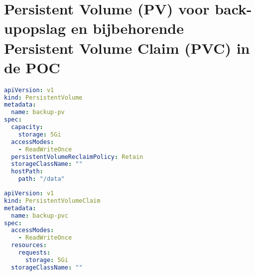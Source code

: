 \chapter{Persistent Volume (PV) voor back-upopslag en bijbehorende Persistent Volume Claim (PVC) in de POC}
\label{sec:pv}
\begin{lstlisting}[language=YAML, caption={YAML-bestand voor de configuratie van het Persistent Volume (PV) dat opslag biedt voor de databaseback-ups in Kubernetes.}]
apiVersion: v1
kind: PersistentVolume
metadata:
  name: backup-pv
spec:
  capacity:
    storage: 5Gi
  accessModes:
    - ReadWriteOnce
  persistentVolumeReclaimPolicy: Retain
  storageClassName: ""  
  hostPath:
    path: "/data"  

\end{lstlisting}

\begin{lstlisting}[language=YAML, caption={YAML-bestand voor de configuratie van de Persistent Volume Claim (PVC).}]
apiVersion: v1
kind: PersistentVolumeClaim
metadata:
  name: backup-pvc
spec:
  accessModes:
    - ReadWriteOnce
  resources:
    requests:
      storage: 5Gi
  storageClassName: ""

\end{lstlisting}

